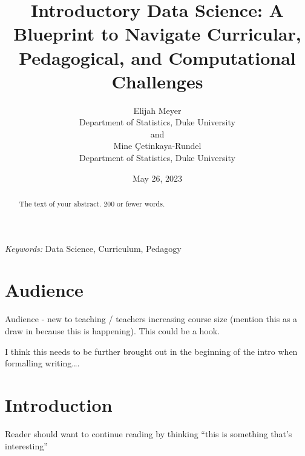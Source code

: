 \documentclass[
  12pt]{article}
\begin{document}
\def\spacingset#1{\renewcommand{\baselinestretch}%
{#1}\small\normalsize} \spacingset{1}



\date{May 26, 2023}
\title{\bf Introductory Data Science: A Blueprint to Navigate
Curricular, Pedagogical, and Computational Challenges}
\author{
Elijah Meyer\\
Department of Statistics, Duke University\\
and\\Mine Çetinkaya-Rundel\\
Department of Statistics, Duke University\\
}
\maketitle

\bigskip
\bigskip
\begin{abstract}
The text of your abstract. 200 or fewer words.
\end{abstract}

\noindent%
{\it Keywords:} Data Science, Curriculum, Pedagogy
\vfill

\newpage
\spacingset{1.9} %
\ifdefined\Shaded\renewenvironment{Shaded}{\begin{tcolorbox}[borderline west={3pt}{0pt}{shadecolor}, boxrule=0pt, sharp corners, interior hidden, enhanced, frame hidden, breakable]}{\end{tcolorbox}}\fi

\hypertarget{audience}{%
\section{Audience}\label{audience}}

Audience - new to teaching / teachers increasing course size (mention
this as a draw in because this is happening). This could be a hook.

I think this needs to be further brought out in the beginning of the
intro when formalling writing\ldots.

\hypertarget{sec-intro}{%
\section{Introduction}\label{sec-intro}}

Reader should want to continue reading by thinking ``this is something
that's interesting''
\end{document}
